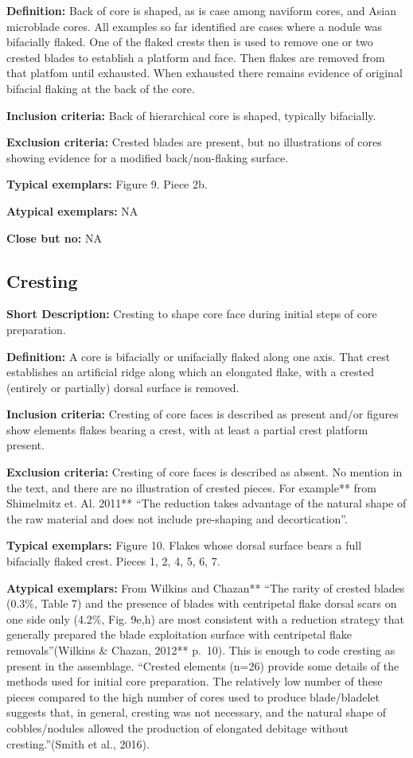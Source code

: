 \documentclass[
]{article}
\begin{document}
\textbf{Definition:} Back of core is shaped, as is case among naviform
cores, and Asian microblade cores. All examples so far identified are
cases where a nodule was bifacially flaked. One of the flaked crests
then is used to remove one or two crested blades to establish a platform
and face. Then flakes are removed from that platfom until exhausted.
When exhausted there remains evidence of original bifacial flaking at
the back of the core.

\textbf{Inclusion criteria:} Back of hierarchical core is shaped,
typically bifacially.

\textbf{Exclusion criteria:} Crested blades are present, but no
illustrations of cores showing evidence for a modified back/non-flaking
surface.

\textbf{Typical exemplars:} Figure 9. Piece 2b.

\textbf{Atypical exemplars:} NA

\textbf{Close but no:} NA

\hypertarget{cresting}{%
\subsection{Cresting}\label{cresting}}

\textbf{Short Description:} Cresting to shape core face during initial
steps of core preparation.

\textbf{Definition:} A core is bifacially or unifacially flaked along
one axis. That crest establishes an artificial ridge along which an
elongated flake, with a crested (entirely or partially) dorsal surface
is removed.

\textbf{Inclusion criteria:} Cresting of core faces is described as
present and/or figures show elements flakes bearing a crest, with at
least a partial crest platform present.

\textbf{Exclusion criteria:} Cresting of core faces is described as
absent. No mention in the text, and there are no illustration of crested
pieces. For example** from Shimelmitz et. Al. 2011** ``The reduction
takes advantage of the natural shape of the raw material and does not
include pre-shaping and decortication''.

\textbf{Typical exemplars:} Figure 10. Flakes whose dorsal surface bears
a full bifacially flaked crest. Pieces 1, 2, 4, 5, 6, 7.

\textbf{Atypical exemplars:} From Wilkins and Chazan** ``The rarity of
crested blades (0.3\%, Table 7) and the presence of blades with
centripetal flake dorsal scars on one side only (4.2\%, Fig. 9e,h) are
most consistent with a reduction strategy that generally prepared the
blade exploitation surface with centripetal flake removals''(Wilkins \&
Chazan, 2012** p.~10). This is enough to code cresting as present in the
assemblage. ``Crested elements (n=26) provide some details of the
methods used for initial core preparation. The relatively low number of
these pieces compared to the high number of cores used to produce
blade/bladelet suggests that, in general, cresting was not necessary,
and the natural shape of cobbles/nodules allowed the production of
elongated debitage without cresting.''(Smith et al., 2016).
\end{document}

